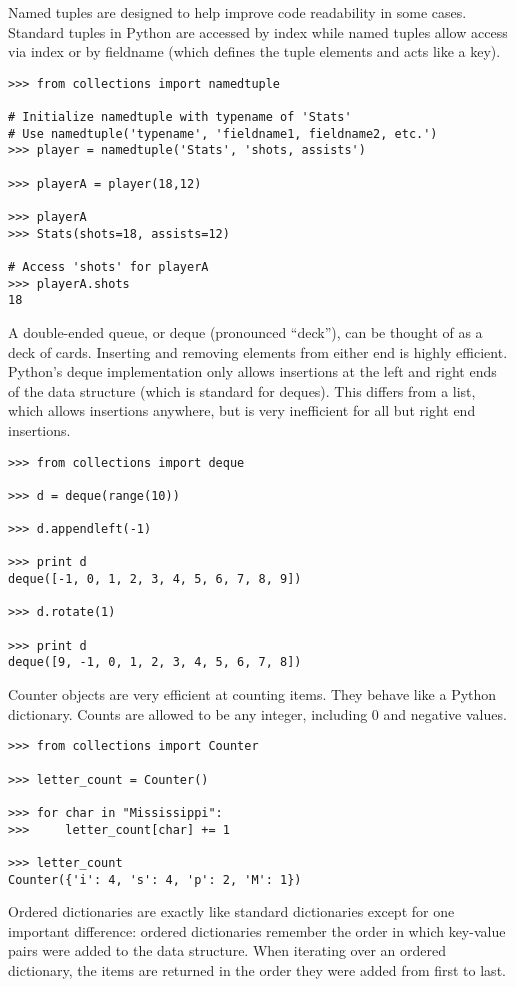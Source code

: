 Named tuples are designed to help improve code readability in some cases.
Standard tuples in Python are accessed by index while named tuples allow access via index or by fieldname (which defines the tuple elements and acts like a key).
\begin{lstlisting}
>>> from collections import namedtuple

# Initialize namedtuple with typename of 'Stats'
# Use namedtuple('typename', 'fieldname1, fieldname2, etc.')
>>> player = namedtuple('Stats', 'shots, assists')

>>> playerA = player(18,12)

>>> playerA
>>> Stats(shots=18, assists=12)

# Access 'shots' for playerA
>>> playerA.shots
18
\end{lstlisting}

A double-ended queue, or deque (pronounced ``deck''), can be thought of as a deck of cards.
Inserting and removing elements from either end is highly efficient.
Python's deque implementation only allows insertions at the left and right ends of the data structure (which is standard for deques).
This differs from a list, which allows insertions anywhere, but is very inefficient for all but right end insertions.

\begin{lstlisting}
>>> from collections import deque

>>> d = deque(range(10))

>>> d.appendleft(-1)

>>> print d
deque([-1, 0, 1, 2, 3, 4, 5, 6, 7, 8, 9])

>>> d.rotate(1)

>>> print d
deque([9, -1, 0, 1, 2, 3, 4, 5, 6, 7, 8])
\end{lstlisting}

Counter objects are very efficient at counting items.  They behave like a Python dictionary.  Counts are allowed to be any integer, including 0 and negative values.

\begin{lstlisting}
>>> from collections import Counter

>>> letter_count = Counter()

>>> for char in "Mississippi":
>>>     letter_count[char] += 1   

>>> letter_count
Counter({'i': 4, 's': 4, 'p': 2, 'M': 1})
\end{lstlisting}

Ordered dictionaries are exactly like standard dictionaries except for one important difference:
ordered dictionaries remember the order in which key-value pairs were added to the data structure.
When iterating over an ordered dictionary, the items are returned in the order they were added from first to last.

